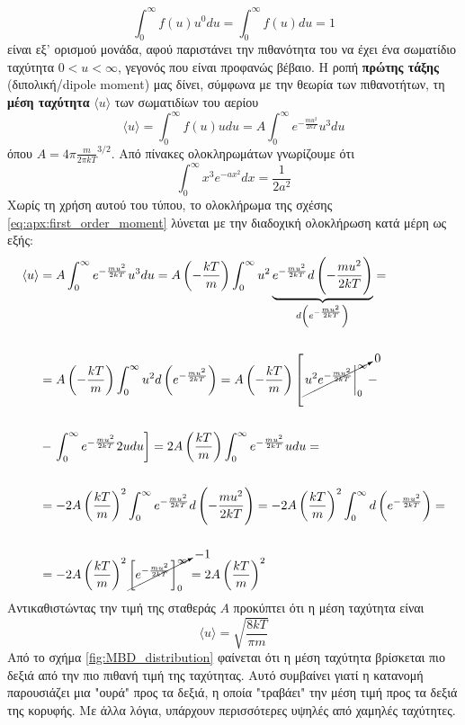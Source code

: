 \begin{equation}
    \label{eq:apx:zeroth_order_moment}
    \int_{0}^{\infty} f(u) u^0 du = \int_{0}^{\infty} f(u) du = 1
\end{equation}
είναι εξ' ορισμού μονάδα, αφού παριστάνει την πιθανότητα του να έχει ένα σωματίδιο ταχύτητα $0 < u < \infty$, γεγονός που είναι προφανώς βέβαιο.
Η ροπή \textbf{πρώτης τάξης} (διπολική/dipole moment) μας δίνει, σύμφωνα με την θεωρία των πιθανοτήτων, τη \textbf{μέση ταχύτητα} $\langle u \rangle$ των σωματιδίων του αερίου
\begin{equation}
    \label{eq:apx:first_order_moment}
    \langle u \rangle = \int_{0}^{\infty} f(u) u du = A \int_{0}^{\infty} e^{-\frac{mu^2}{2kT}} u^3 du
\end{equation}
όπου $A = 4\pi \frac{m}{2\pi kT}^{3/2}$. Από πίνακες ολοκληρωμάτων γνωρίζουμε ότι $$\int_{0}^{\infty} x^3 e^{-ax^2} dx = \frac{1}{2a^2}$$
Χωρίς τη χρήση αυτού του τύπου, το ολοκλήρωμα της σχέσης \eqref{eq:apx:first_order_moment} λύνεται με την διαδοχική ολοκλήρωση κατά μέρη ως εξής:
\begin{align*}
    \langle u \rangle &= A \int_{0}^{\infty} e^{-\frac{mu^2}{2kT}} u^3 du = A \left( -\frac{kT}{m} \right) \int_{0}^{\infty} u^2 \underbrace{e^{-\frac{mu^2}{2kT}} d \left( -\frac{mu^2}{2kT} \right)}_{d\left(e^{- \frac{mu^2}{2kT}} \right)} = \\\\
   &= A \left( -\frac{kT}{m} \right) \int_{0}^{\infty} u^2 d\left(e^{- \frac{mu^2}{2kT}} \right) =  A \left( -\frac{kT}{m} \right) \left[ \cancelto{0}{\left. u^2 e^{-\frac{mu^2}{2kT}} \right|_{0}^{\infty}} - \right.\\\\
   &- \left. \int_{0}^{\infty} e^{-\frac{mu^2}{2kT}} 2u du \right] = 2A \left(\frac{kT}{m} \right) \int_{0}^{\infty} e^{-\frac{mu^2}{2kT}} u du = \\\\
   &= -2A \left(\frac{kT}{m} \right)^2 \int_{0}^{\infty} e^{-\frac{mu^2}{2kT}} d \left( -\frac{mu^2}{2kT} \right) = -2A \left(\frac{kT}{m} \right)^2 \int_{0}^{\infty} d\left(e^{- \frac{mu^2}{2kT}} \right) = \\\\
   &= -2A \left(\frac{kT}{m} \right)^2 \cancelto{-1}{\left[ e^{- \frac{mu^2}{2kT}} \right]_{0}^{\infty}} = 2A \left(\frac{kT}{m} \right)^2 
\end{align*}
Αντικαθιστώντας την τιμή της σταθεράς $A$ προκύπτει ότι η μέση ταχύτητα είναι
\begin{equation}
    \label{eq:apx:mean_speed}
     \boxed{\langle u \rangle = \sqrt{\frac{8kT}{\pi m}}}
\end{equation}
Από το σχήμα \ref{fig:MBD_distribution} φαίνεται ότι η μέση ταχύτητα βρίσκεται πιο δεξιά από την πιο πιθανή τιμή της ταχύτητας. Αυτό συμβαίνει γιατί η κατανομή παρουσιάζει μια "ουρά" προς τα δεξιά, η οποία "τραβάει" την μέση τιμή προς τα δεξιά της κορυφής. Με άλλα λόγια, υπάρχουν περισσότερες υψηλές από χαμηλές ταχύτητες.

